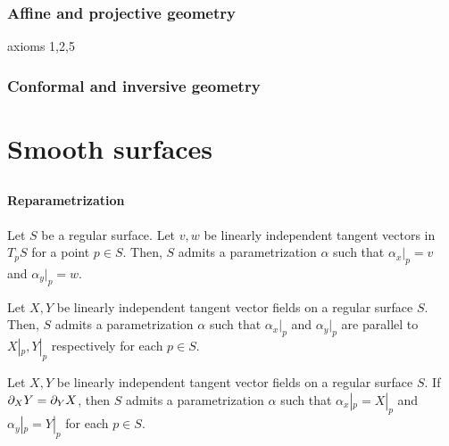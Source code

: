\documentclass{../../large}
\begin{document}
\section{Affine and projective geometry}
axioms 1,2,5
\section{Conformal and inversive geometry}




\part{Smooth surfaces}
\chapter{}

\subsection*{Reparametrization}



\begin{thm}
Let $S$ be a regular surface.
Let $v,w$ be linearly independent tangent vectors in $T_pS$ for a point $p\in S$.
Then, $S$ admits a parametrization $\alpha$ such that $\alpha_x|_p=v$ and $\alpha_y|_p=w$.
\end{thm}
\begin{thm}
Let $X,Y$ be linearly independent tangent vector fields on a regular surface $S$.
Then, $S$ admits a parametrization $\alpha$ such that $\alpha_x|_p$ and $\alpha_y|_p$ are parallel to $X|_p,Y|_p$ respectively for each $p\in S$.
\end{thm}
\begin{thm}
Let $X,Y$ be linearly independent tangent vector fields on a regular surface $S$.
If $\pd_XY=\pd_YX$, then $S$ admits a parametrization $\alpha$ such that $\alpha_x|_p=X|_p$ and $\alpha_y|_p=Y|_p$ for each $p\in S$.
\end{thm}
\end{document}
